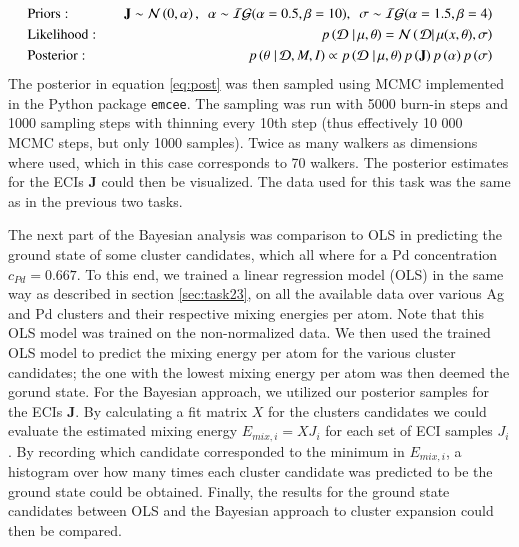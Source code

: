 \documentclass[11pt,a4paper]{article}
\begin{document}
\begin{align}
    \label{eq:prior}
    &\text{Priors}: \hspace{10px} & \mathbf{J} \sim \mathcal{N}\left(0, \alpha \right), \hspace{5px}  \alpha \sim \mathcal{IG}(\alpha=0.5,\beta=10), \hspace{5px} \sigma \sim \mathcal{IG}(\alpha=1.5,\beta=4) \\
    \label{eq:like}
    &\text{Likelihood}: \hspace{10px} &p\left(\mathcal{D} \left. \right\vert \mu, \theta \right)  = \mathcal{N}\left( \left.\mathcal{D} \right\vert \mu(x, \theta), \sigma\right)\\
    \label{eq:post}
    &\text{Posterior}: \hspace{10px} &p\left(\theta \left. \right\vert \mathcal{D}, M, I \right) \propto p\left(\mathcal{D} \left. \right\vert \mu, \theta \right) p\left(\mathbf{J}\right)p\left(\alpha\right)p\left(\sigma\right)
\end{align}
The posterior in equation \eqref{eq:post} was then sampled using MCMC implemented in the Python package \texttt{emcee}. The sampling was run with 5000 burn-in steps and 1000 sampling steps with thinning every 10th step (thus effectively 10 000 MCMC steps, but only 1000 samples). Twice as many walkers as dimensions where used, which in this case corresponds to 70 walkers. The posterior estimates for the ECIs $\mathbf{J}$ could then be visualized. The data used for this task was the same as in the previous two tasks.

The next part of the Bayesian analysis was comparison to OLS in predicting the ground state of some cluster candidates, which all where for a Pd concentration $c_{Pd}=0.667$. To this end, we trained a linear regression model (OLS) in the same way as described in section \ref{sec:task23}, on all the available data over various Ag and Pd clusters and their respective mixing energies per atom. Note that this OLS model was trained on the non-normalized data. We then used the trained OLS model to predict the mixing energy per atom for the various cluster candidates; the one with the lowest mixing energy per atom was then deemed the gorund state. For the Bayesian approach, we utilized our posterior samples for the ECIs $\mathbf{J}$. By calculating a fit matrix $X$ for the clusters candidates we could evaluate the estimated mixing energy $E_{mix, i} = XJ_i$ for each set of ECI samples $J_i$. By recording which candidate corresponded to the minimum in $E_{mix, i}$, a histogram over how many times each cluster candidate was predicted to be the ground state could be obtained. Finally, the results for the ground state candidates between OLS and the Bayesian approach to cluster expansion could then be compared.  
\end{document}
